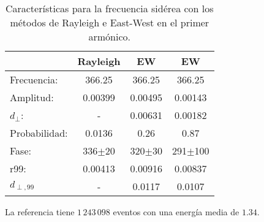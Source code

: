     \begin{table}[H]
        \begin{small}
            \begin{center}
                \begin{tabular}[c]{l|c||c|c}
                                    & Rayleigh     & EW         & EW\cite{Aab_2020}      \\\hline
                    Frecuencia:     & 366.25	   & 366.25     & 366.25      \\
                    Amplitud:       & 0.00399	   & 0.00495    & 0.00143      \\
                    $d_\perp$:      & -	           & 0.00631    & 0.00182      \\ 
                    Probabilidad:   & 0.0136	   & 0.26       & 0.87      \\
                    Fase:           & 336$\pm$20   & 320$\pm$30 & 291$\pm$100      \\
                    r99:            & 0.00413	   & 0.00916    & 0.00837      \\
                    $d_{\perp,99}$  & -            & 0.0117     & 0.0107       \\
                \end{tabular}
            \end{center}
        \end{small}
        \caption{Características para la frecuencia sidérea con los métodos de Rayleigh  e East-West en el primer armónico.}
        \label{tab:solar}
    \end{table}

    La referencia tiene $1\,243\,098$ eventos con una energía media de $1.34$.
    
    
    
    
